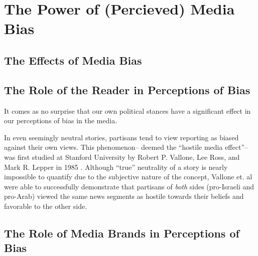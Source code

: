 \chapter{The Power of (Percieved) Media Bias}




\section{The Effects of Media Bias}


 


\section{The Role of the Reader in Perceptions of Bias}

It comes as no surprise that our own political stances have a significant effect in our perceptions of bias in the media. 

In even seemingly neutral stories, partisans tend to view reporting as biased against their own views. This phenomenon-- deemed the ``hostile media effect''-- was first studied at Stanford University by Robert P. Vallone, Lee Ross, and Mark R. Lepper in 1985 \cite{vallone1985hostile}. Although ``true'' neutrality of a story is nearly impossible to quantify due to the subjective nature of the concept, Vallone et. al were able to successfully demonstrate that partisans of \emph{both} sides (pro-Israeli and pro-Arab) viewed the same news segments as hostile towards their beliefs and favorable to the other side.

  

\section{The Role of Media Brands in Perceptions of Bias}


